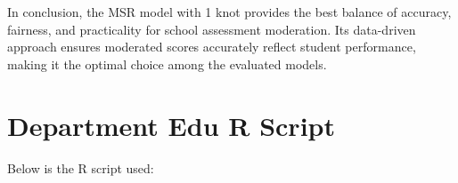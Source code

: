 \documentclass{article}
\begin{document}
In conclusion, the MSR model with 1 knot provides the best balance of accuracy, fairness, and practicality for school assessment moderation. Its data-driven approach ensures moderated scores accurately reflect student performance, making it the optimal choice among the evaluated models.

\section{Department Edu R Script}

Below is the R script used:


\end{document}
